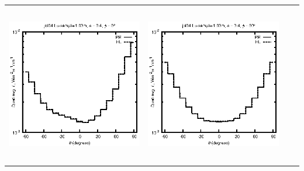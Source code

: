 \begin{tabular}{c c c c}
\includegraphics[height=7cm]{../eps/jol04_Lu_sample_1.00m_fwd.eps} &
\includegraphics[height=7cm]{../eps/jol04_Lu_sample_1.00m_cross.eps} \\
\end{tabular}

\pagebreak

